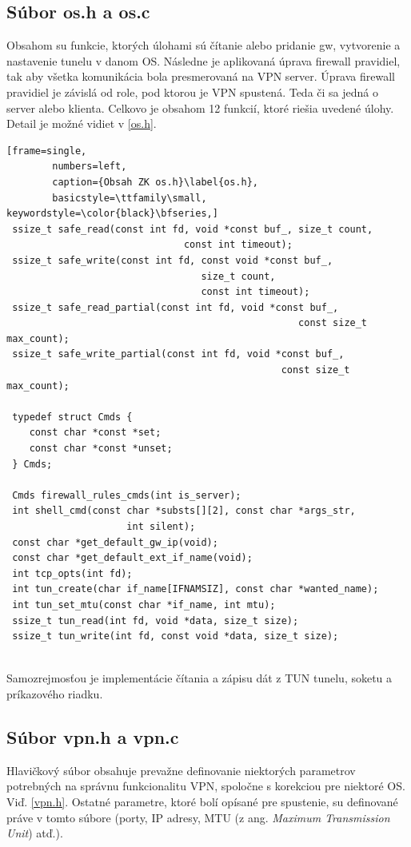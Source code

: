  \subsection{Súbor os.h a os.c}
Obsahom su funkcie, ktorých úlohami sú čítanie alebo pridanie \acrshort{gw}, vytvorenie a nastavenie tunelu v danom OS. Následne je aplikovaná úprava firewall pravidiel, tak aby všetka komunikácia bola presmerovaná na VPN server. Úprava firewall pravidiel je závislá od role, pod ktorou je VPN spustená. Teda či sa jedná o server alebo klienta. 
Celkovo je obsahom 12 funkcií, ktoré riešia uvedené úlohy. Detail je možné vidiet v \ref{os.h}.
 
 \begin{minipage}{\linewidth} 	
	\begin{lstlisting}[frame=single,
		numbers=left,
		caption={Obsah ZK os.h}\label{os.h},
		basicstyle=\ttfamily\small, keywordstyle=\color{black}\bfseries,]
 ssize_t safe_read(const int fd, void *const buf_, size_t count, 
 						       const int timeout);
 ssize_t safe_write(const int fd, const void *const buf_, 
 							      size_t count,
 							      const int timeout);
 ssize_t safe_read_partial(const int fd, void *const buf_,
 							 					   const size_t max_count);
 ssize_t safe_write_partial(const int fd, void *const buf_, 
 							    		     	const size_t max_count);
 
 typedef struct Cmds {
 	const char *const *set;
 	const char *const *unset;
 } Cmds;
 
 Cmds firewall_rules_cmds(int is_server);
 int shell_cmd(const char *substs[][2], const char *args_str,
 			         int silent);
 const char *get_default_gw_ip(void);
 const char *get_default_ext_if_name(void);
 int tcp_opts(int fd);
 int tun_create(char if_name[IFNAMSIZ], const char *wanted_name);
 int tun_set_mtu(const char *if_name, int mtu);
 ssize_t tun_read(int fd, void *data, size_t size);
 ssize_t tun_write(int fd, const void *data, size_t size); 
\end{lstlisting}
\end{minipage}\\ 
Samozrejmosťou je implementácie čítania a zápisu dát z TUN tunelu, soketu a príkazového riadku. 
 \subsection{Súbor vpn.h a vpn.c}
 Hlavičkový súbor obsahuje prevažne definovanie niektorých parametrov potrebných na správnu funkcionalitu VPN, spoločne s korekciou pre niektoré OS. Viď. \ref{vpn.h}. Ostatné parametre, ktoré bolí opísané pre spustenie, su definované práve v tomto súbore (porty, IP adresy, MTU (z ang. \textit{Maximum Transmission Unit}) atď.).
 
